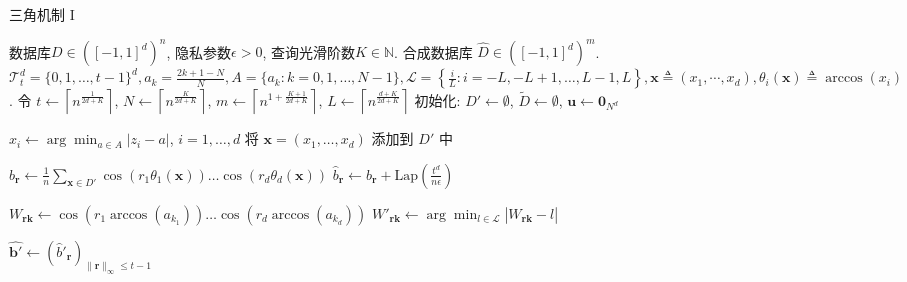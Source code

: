 \begin{algorithm}[hbtp]
\caption{三角机制 I}\label{alg:三角机制I}
\begin{algorithmic}[1]
  \REQUIRE 数据库$D \in \left([-1,1]^d \right)^n$, 隐私参数$\epsilon > 0$, 查询光滑阶数$K\in\mathbb{N}$.
  \ENSURE 合成数据库 $\hat{D} \in \left([-1,1]^d \right)^m$.
  \NOTATION $\mathcal{T}_{t}^d = \{0,1,\ldots,t-1\}^d, a_k = \frac{2k+1-N}{N}, A = \{a_k\colon k=0,1,\ldots, N-1\}, \mathcal{L} = \left\{\frac{i}{L}\colon i=-L, -L+1, \ldots, L-1, L\right\}, \mathbf{x} \triangleq (x_1, \cdots, x_d), \theta_i(\mathbf{x}) \triangleq \arccos(x_i)$. 
  \STATE 令 $t \leftarrow \left\lceil n^{\frac{1}{2d+K}} \right\rceil$,
   $N\leftarrow\left\lceil n^\frac{K}{2d+K}\right\rceil$, $m\leftarrow\left\lceil n^{1+\frac{K+1}{2d+K}}\right\rceil$,
   $L\leftarrow\left\lceil n^{\frac{d+K}{2d+K}}\right\rceil$ \label{alg:line:三角机制I参数设定}
  \STATE 初始化: $D' \leftarrow \emptyset$, $\tilde{D} \leftarrow \emptyset$, $\mathbf{u} \leftarrow \mathbf{0}_{N^d}$ \label{alg:line:初始化}

   \label{alg:line:原始数据离散化:begin}
    \STATE $x_i \leftarrow \arg\min_{a\in A}|z_i-a|$, $i=1,\ldots,d$
    \STATE 将 $\mathbf{x}=(x_1,\ldots,x_d)$ 添加到 $D'$ 中
  \ENDFOR \label{alg:line:原始数据离散化:end}

   \label{alg:line:查询基表示}
    \STATE $b_{\mathbf{r}} \leftarrow \frac{1}{n} \sum_{\mathbf{x}\in D'}\cos\left(r_1 \theta_1(\mathbf{x}) \right)\ldots \cos \left(r_d \theta_d(\mathbf{x}) \right)$ \label{alg:line:计算原始数据查询基结果}
    \STATE $\hat{b}_{\mathbf{r}} \leftarrow b_{\mathbf{r}} + \mathrm{Lap}\left(\frac{t^d}{n \epsilon}\right)$ \label{alg:line:对查询基结果增加噪音}
     \label{alg:line:LP编码离散化}
  \ENDFOR

   \label{alg:line:计算格点查询基结果:begin}
      \STATE $W_{\mathbf{rk}} \leftarrow \cos \left(r_1 \arccos(a_{k_1}) \right)\ldots \cos \left(r_d \arccos(a_{k_d}) \right)$ \label{alg:line:计算格点查询基结果}
      \STATE $W'_{\mathbf{rk}} \leftarrow\arg\min_{l\in \mathcal{L}}|W_{\mathbf{rk}}-l|$ \label{alg:line:LP编码离散化2}
    \ENDFOR
  \ENDFOR \label{alg:line:计算格点查询基结果:end}
  
  \STATE $\hat{\mathbf{b}'} \leftarrow \left(\hat{b}'_{\mathbf{r}}\right)_{\|\mathbf{r}\|_{\infty}
  \le t-1}$


\end{algorithmic}
\end{algorithm}

